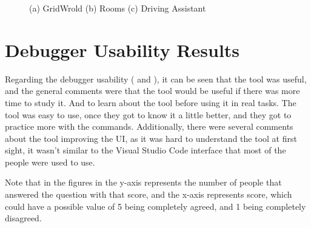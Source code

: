 \begin{figure}
    \centering
    \caption{(a) GridWrold (b) Rooms (c) Driving Assistant}
    \label{fig:general-know}
\end{figure}

\section{Debugger Usability Results}
\label{sec:usability}

Regarding the debugger usability ( and ), it can 
be seen that the tool was useful,
and the general comments were that the tool would be useful if there was more time to study it. 
And to learn about the tool before using it in real tasks. The 
tool was easy to use, once they got to know it a little better, and they got to practice more with the commands.
Additionally, there were several comments about the tool improving the UI,
as it was hard to understand the tool at first sight, it wasn't similar to the Visual Studio Code 
interface that most of the people were used to use.

Note that in the figures in  the y-axis represents the number of people 
that answered the question with that score, and the x-axis represents score, which could have a 
possible value of 5 being completely agreed, and 1 being completely disagreed.

